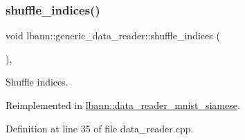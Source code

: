 \subsubsection{\texorpdfstring{shuffle\+\_\+indices()}{shuffle\_indices()}}
{\footnotesize\ttfamily void lbann\+::generic\+\_\+data\+\_\+reader\+::shuffle\+\_\+indices (\begin{DoxyParamCaption}{ }\end{DoxyParamCaption})\hspace{0.3cm}{\ttfamily [protected]}, {\ttfamily [virtual]}}



Shuffle indices. 



Reimplemented in \hyperlink{classlbann_1_1data__reader__mnist__siamese_ad1949fc1a71af86d792e927c0181f87d}{lbann\+::data\+\_\+reader\+\_\+mnist\+\_\+siamese}.



Definition at line 35 of file data\+\_\+reader.\+cpp.


